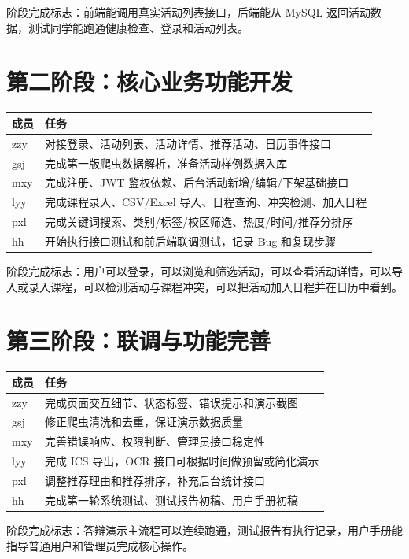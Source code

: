 \documentclass[UTF8,a4paper,12pt,fontset=none]{ctexrep}
\begin{document}
阶段完成标志：前端能调用真实活动列表接口，后端能从 MySQL 返回活动数据，测试同学能跑通健康检查、登录和活动列表。

\section{第二阶段：核心业务功能开发}
\begin{longtable}{|p{}|p{}|}
\hline
\textbf{成员} & \textbf{任务} \\
\hline
zzy & 对接登录、活动列表、活动详情、推荐活动、日历事件接口 \\
\hline
gsj & 完成第一版爬虫数据解析，准备活动样例数据入库 \\
\hline
mxy & 完成注册、JWT 鉴权依赖、后台活动新增/编辑/下架基础接口 \\
\hline
lyy & 完成课程录入、CSV/Excel 导入、日程查询、冲突检测、加入日程 \\
\hline
pxl & 完成关键词搜索、类别/标签/校区筛选、热度/时间/推荐分排序 \\
\hline
hh & 开始执行接口测试和前后端联调测试，记录 Bug 和复现步骤 \\
\hline
\end{longtable}

阶段完成标志：用户可以登录，可以浏览和筛选活动，可以查看活动详情，可以导入或录入课程，可以检测活动与课程冲突，可以把活动加入日程并在日历中看到。

\section{第三阶段：联调与功能完善}
\begin{longtable}{|p{}|p{}|}
\hline
\textbf{成员} & \textbf{任务} \\
\hline
zzy & 完成页面交互细节、状态标签、错误提示和演示截图 \\
\hline
gsj & 修正爬虫清洗和去重，保证演示数据质量 \\
\hline
mxy & 完善错误响应、权限判断、管理员接口稳定性 \\
\hline
lyy & 完成 ICS 导出，OCR 接口可根据时间做预留或简化演示 \\
\hline
pxl & 调整推荐理由和推荐排序，补充后台统计接口 \\
\hline
hh & 完成第一轮系统测试、测试报告初稿、用户手册初稿 \\
\hline
\end{longtable}

阶段完成标志：答辩演示主流程可以连续跑通，测试报告有执行记录，用户手册能指导普通用户和管理员完成核心操作。
\end{document}
